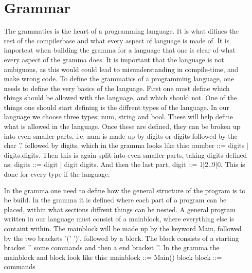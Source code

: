 \section{Grammar}
The grammatics is the heart of a programming language. It is what difines the rest of the compilerbase and what every aspect of language is made of.
It is importeat when building the gramma for a language that one is clear of what every aspect of the gramma does. It is important that the language is not ambiguous, as this would could lead to misunderstanding in compile-time, and make wrong code.
To define the grammatics of a programming language, one needs to define the very basics of the language. First one must define which things should be allowed with the language, and which should not.
One of the things one should start defining is the diffrent types of the language. In our language we choose three types; num, string and bool. These will help define what is allowed in the language. Once these are defined, they can be broken up into even smaller parts, i.e. num is made up by digits or digits followed by the char '.' followed by digits, which in the gramma looks like this; number ::= digits | digits.digits.
Then this is again split into even smaller parts, taking digits defined as; digits ::= digit | digit digits. And then the last part, digit ::= 1|2..9|0. This is done for every type if the language.

In the gramma one need to define how the general structure of the program is to be build. In the gramma it is defined where each part of a program can be placed, within what sections diffrent things can be nested. A general program written in our language must consist of a mainblock, where everything else is containt within. The mainblock will be made up by the keyword Main, followed by the two brackets '(' ')', followed by a block.
The block consists of a starting bracket '{' some commands and then a end bracket '}'. In the gramma the mainblock and block look like this: mainblock ::= Main() block
block ::= { commands }